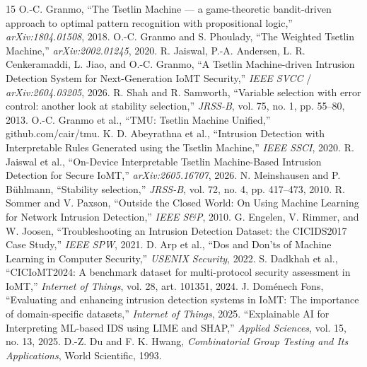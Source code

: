 \documentclass[conference]{IEEEtran}
\begin{document}
\begin{thebibliography}{15}
 O.-C. Granmo, ``The Tsetlin Machine --- a
game-theoretic bandit-driven approach to optimal pattern recognition with
propositional logic,'' \emph{arXiv:1804.01508}, 2018.
 O.-C. Granmo and S. Phoulady, ``The Weighted Tsetlin
Machine,'' \emph{arXiv:2002.01245}, 2020.
 R. Jaiswal, P.-A. Andersen, L. R. Cenkeramaddi,
L. Jiao, and O.-C. Granmo, ``A Tsetlin Machine-driven Intrusion Detection
System for Next-Generation IoMT Security,'' \emph{IEEE SVCC} /
\emph{arXiv:2604.03205}, 2026.
 R. Shah and R. Samworth, ``Variable selection with error
control: another look at stability selection,'' \emph{JRSS-B}, vol. 75,
no. 1, pp. 55--80, 2013.
 O.-C. Granmo et al., ``TMU: Tsetlin Machine Unified,''
github.com/cair/tmu.
 K. D. Abeyrathna et al., ``Intrusion Detection
with Interpretable Rules Generated using the Tsetlin Machine,'' \emph{IEEE
SSCI}, 2020.
 R. Jaiswal et al., ``On-Device Interpretable
Tsetlin Machine-Based Intrusion Detection for Secure IoMT,''
\emph{arXiv:2605.16707}, 2026.
 N. Meinshausen and P. B\"uhlmann, ``Stability
selection,'' \emph{JRSS-B}, vol. 72, no. 4, pp. 417--473, 2010.
 R. Sommer and V. Paxson, ``Outside the Closed World: On
Using Machine Learning for Network Intrusion Detection,'' \emph{IEEE S\&P},
2010.
 G. Engelen, V. Rimmer, and W. Joosen,
``Troubleshooting an Intrusion Detection Dataset: the CICIDS2017 Case
Study,'' \emph{IEEE SPW}, 2021.
 D. Arp et al., ``Dos and Don'ts of Machine Learning in
Computer Security,'' \emph{USENIX Security}, 2022.
 S. Dadkhah et al., ``CICIoMT2024: A benchmark dataset
for multi-protocol security assessment in IoMT,'' \emph{Internet of Things},
vol. 28, art. 101351, 2024.
 J. Dom\'enech Fons, ``Evaluating and enhancing
intrusion detection systems in IoMT: The importance of domain-specific
datasets,'' \emph{Internet of Things}, 2025.
 ``Explainable AI for Interpreting ML-based IDS using
LIME and SHAP,'' \emph{Applied Sciences}, vol. 15, no. 13, 2025.
 D.-Z. Du and F. K. Hwang, \emph{Combinatorial Group Testing
and Its Applications}, World Scientific, 1993.
\end{thebibliography}
\end{document}
